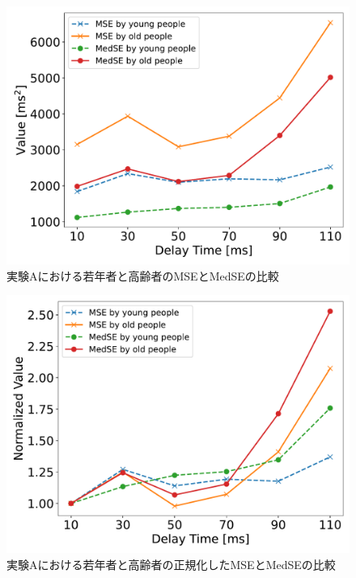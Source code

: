 \begin{figure}[tbp]
  \centering
  \includegraphics[scale=0.5]{figures/Honbann/Comparison_young_old/110_MSE-MedSE.pdf}
  \caption{実験Aにおける若年者と高齢者のMSEとMedSEの比較}
  \label{fig:110ms_MSE_MedSE}
\end{figure}
\begin{figure}[tbp]
  \centering
  \includegraphics[scale=0.5]{figures/Honbann/Comparison_young_old/110_MSE-MedSE_normalized.pdf}
  \caption{実験Aにおける若年者と高齢者の正規化したMSEとMedSEの比較}
  \label{fig:Normalized_110ms_MSE_MedSE}
\end{figure}
